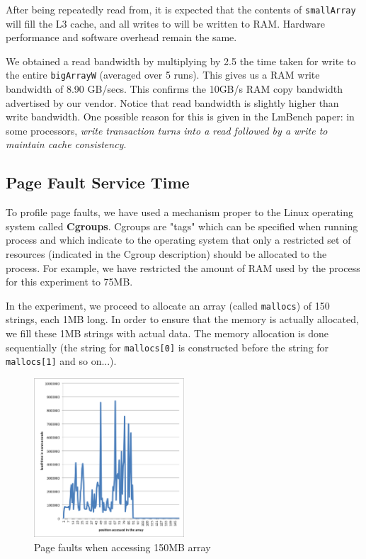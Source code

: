After being repeatedly read from, it is expected that the contents of \texttt{smallArray} will fill the L3 cache, and all writes to  will be written to RAM. Hardware performance and software overhead remain the same.

We obtained a read bandwidth by multiplying by 2.5 the time taken for write to the entire \texttt{bigArrayW} (averaged over 5 runs). This gives us a RAM write bandwidth of 8.90 GB/secs. This confirms the 10GB/s RAM copy bandwidth advertised by our vendor. Notice that read bandwidth is slightly higher than write bandwidth. One possible reason for this is given in the LmBench paper: in some processors, \emph{write transaction turns into a read followed by a write to maintain cache consistency}.

\subsection{Page Fault Service Time}

To profile page faults, we have used a mechanism proper to the Linux operating system called \textbf{Cgroups}. Cgroups are "tags" which can be specified when running process and which indicate to the operating system that only a restricted set of resources (indicated in the Cgroup description) should be allocated to the process. For example, we have restricted the amount of RAM used by the process for this experiment to 75MB.

In the experiment, we proceed to allocate an array (called \texttt{mallocs}) of 150 strings, each 1MB long. In order to ensure that the memory is actually allocated, we fill these 1MB strings with actual data. The memory allocation is done sequentially (the string for \texttt{mallocs[0]} is constructed before the string for \texttt{mallocs[1]} and so on...).

\begin{figure}
 \centering
  \includegraphics[width=0.5\textwidth]{image/pagefault.png}
  \caption{Page faults when accessing 150MB array}
 \label{fig:pagefault}
\end{figure}

